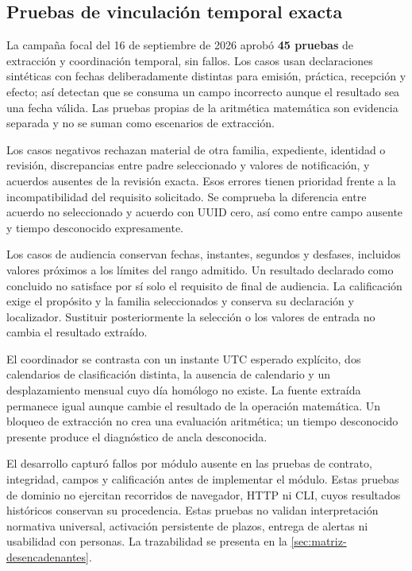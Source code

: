 \subsection{Pruebas de vinculación temporal exacta}\label{sec:pruebas-desencadenantes}

La campaña focal del 16 de septiembre de 2026 aprobó \textbf{45 pruebas} de extracción y coordinación temporal, sin fallos. Los casos usan declaraciones sintéticas con fechas deliberadamente distintas para emisión, práctica, recepción y efecto; así detectan que se consuma un campo incorrecto aunque el resultado sea una fecha válida. Las pruebas propias de la aritmética matemática son evidencia separada y no se suman como escenarios de extracción.

Los casos negativos rechazan material de otra familia, expediente, identidad o revisión, discrepancias entre padre seleccionado y valores de notificación, y acuerdos ausentes de la revisión exacta. Esos errores tienen prioridad frente a la incompatibilidad del requisito solicitado. Se comprueba la diferencia entre acuerdo no seleccionado y acuerdo con UUID cero, así como entre campo ausente y tiempo desconocido expresamente.

Los casos de audiencia conservan fechas, instantes, segundos y desfases, incluidos valores próximos a los límites del rango admitido. Un resultado declarado como concluido no satisface por sí solo el requisito de final de audiencia. La calificación exige el propósito y la familia seleccionados y conserva su declaración y localizador. Sustituir posteriormente la selección o los valores de entrada no cambia el resultado extraído.

El coordinador se contrasta con un instante UTC esperado explícito, dos calendarios de clasificación distinta, la ausencia de calendario y un desplazamiento mensual cuyo día homólogo no existe. La fuente extraída permanece igual aunque cambie el resultado de la operación matemática. Un bloqueo de extracción no crea una evaluación aritmética; un tiempo desconocido presente produce el diagnóstico de ancla desconocida.

El desarrollo capturó fallos por módulo ausente en las pruebas de contrato, integridad, campos y calificación antes de implementar el módulo. Estas pruebas de dominio no ejercitan recorridos de navegador, HTTP ni CLI, cuyos resultados históricos conservan su procedencia. Estas pruebas no validan interpretación normativa universal, activación persistente de plazos, entrega de alertas ni usabilidad con personas. La trazabilidad se presenta en la \cref{sec:matriz-desencadenantes}.

